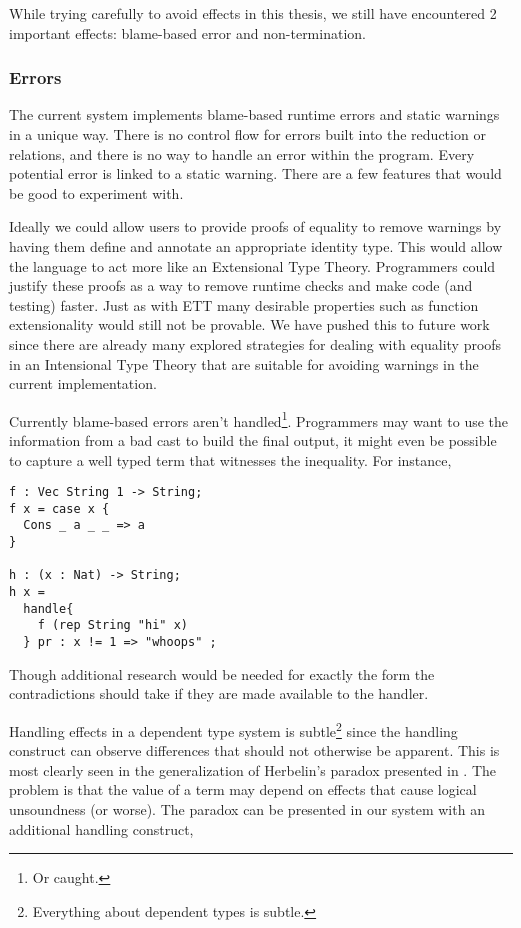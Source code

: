 While trying carefully to avoid effects in this thesis, we still have encountered 2 important effects: blame-based error and non-termination.

\subsubsection{Errors}

The current system implements blame-based runtime errors and static warnings in a unique way.
There is no control flow for errors built into the reduction or \cbv{} relations, and there is no way to handle an error within the program.
Every potential error is linked to a static warning.
There are a few features that would be good to experiment with.

Ideally we could allow users to provide proofs of equality to remove warnings by having them define and annotate an appropriate identity type.
This would allow the language to act more like an Extensional Type Theory.
Programmers could justify these proofs as a way to remove runtime checks and make code (and testing) faster.
Just as with \ac{ETT} many desirable properties such as function extensionality would still not be provable.
We have pushed this to future work since there are already many explored strategies for dealing with equality proofs in an Intensional Type Theory that are suitable for avoiding warnings in the current implementation.

Currently blame-based errors aren't handled\footnote{Or caught.}.
Programmers may want to use the information from a bad cast to build the final output, it might even be possible to capture a well typed term that witnesses the inequality.
For instance,
\begin{lstlisting}[basicstyle={\ttfamily}]
f : Vec String 1 -> String;
f x = case x {
  Cons _ a _ _ => a
}

h : (x : Nat) -> String;
h x =
  handle{
    f (rep String "hi" x)
  } pr : x != 1 => "whoops" ;
\end{lstlisting}

Though additional research would be needed for exactly the form the contradictions should take if they are made available to the handler.

Handling effects in a dependent type system is subtle\footnote{
  Everything about dependent types is subtle.
} since the handling construct can observe differences that should not otherwise be apparent.
This is most clearly seen in the generalization of Herbelin's paradox presented in \cite{10.1145/3371126}.
The problem is that the value of a \Bool{} term may depend on effects that cause logical unsoundness (or worse).
The paradox can be presented in our system with an additional handling construct,

